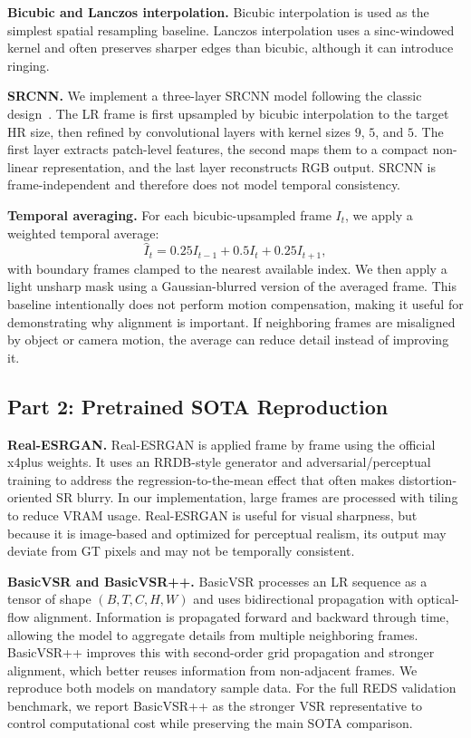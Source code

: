 \documentclass[10pt,twocolumn,letterpaper]{article}
\begin{document}
\textbf{Bicubic and Lanczos interpolation.}
Bicubic interpolation is used as the simplest spatial resampling baseline. Lanczos interpolation uses a sinc-windowed kernel and often preserves sharper edges than bicubic, although it can introduce ringing.

\textbf{SRCNN.}
We implement a three-layer SRCNN model following the classic design~\cite{dong2015srcnn}. The LR frame is first upsampled by bicubic interpolation to the target HR size, then refined by convolutional layers with kernel sizes $9$, $5$, and $5$. The first layer extracts patch-level features, the second maps them to a compact non-linear representation, and the last layer reconstructs RGB output. SRCNN is frame-independent and therefore does not model temporal consistency.

\textbf{Temporal averaging.}
For each bicubic-upsampled frame $I_t$, we apply a weighted temporal average:
\begin{equation}
\hat{I}_t = 0.25 I_{t-1} + 0.5 I_t + 0.25 I_{t+1},
\end{equation}
with boundary frames clamped to the nearest available index. We then apply a light unsharp mask using a Gaussian-blurred version of the averaged frame. This baseline intentionally does not perform motion compensation, making it useful for demonstrating why alignment is important. If neighboring frames are misaligned by object or camera motion, the average can reduce detail instead of improving it.

\subsection{Part 2: Pretrained SOTA Reproduction}
\textbf{Real-ESRGAN.}
Real-ESRGAN is applied frame by frame using the official x4plus weights. It uses an RRDB-style generator and adversarial/perceptual training to address the regression-to-the-mean effect that often makes distortion-oriented SR blurry. In our implementation, large frames are processed with tiling to reduce VRAM usage. Real-ESRGAN is useful for visual sharpness, but because it is image-based and optimized for perceptual realism, its output may deviate from GT pixels and may not be temporally consistent.

\textbf{BasicVSR and BasicVSR++.}
BasicVSR processes an LR sequence as a tensor of shape $(B,T,C,H,W)$ and uses bidirectional propagation with optical-flow alignment. Information is propagated forward and backward through time, allowing the model to aggregate details from multiple neighboring frames. BasicVSR++ improves this with second-order grid propagation and stronger alignment, which better reuses information from non-adjacent frames. We reproduce both models on mandatory sample data. For the full REDS validation benchmark, we report BasicVSR++ as the stronger VSR representative to control computational cost while preserving the main SOTA comparison.
\end{document}
